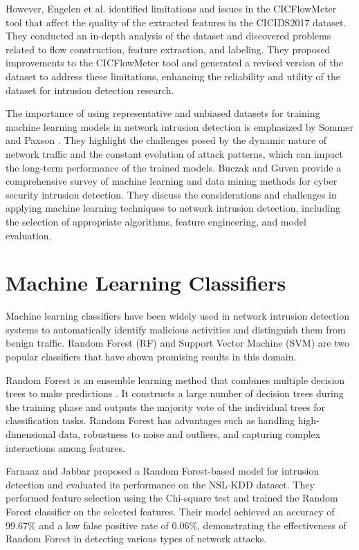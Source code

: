 However, Engelen et al. \cite{engelen2021troubleshooting} identified limitations and issues in the CICFlowMeter tool that affect the quality of the extracted features in the CICIDS2017 dataset. They conducted an in-depth analysis of the dataset and discovered problems related to flow construction, feature extraction, and labeling. They proposed improvements to the CICFlowMeter tool and generated a revised version of the dataset to address these limitations, enhancing the reliability and utility of the dataset for intrusion detection research.

The importance of using representative and unbiased datasets for training machine learning models in network intrusion detection is emphasized by Sommer and Paxson \cite{sommer2010outside}. They highlight the challenges posed by the dynamic nature of network traffic and the constant evolution of attack patterns, which can impact the long-term performance of the trained models. Buczak and Guven \cite{buczak2015survey} provide a comprehensive survey of machine learning and data mining methods for cyber security intrusion detection. They discuss the considerations and challenges in applying machine learning techniques to network intrusion detection, including the selection of appropriate algorithms, feature engineering, and model evaluation.

\section{Machine Learning Classifiers}

Machine learning classifiers have been widely used in network intrusion detection systems to automatically identify malicious activities and distinguish them from benign traffic. Random Forest (RF) and Support Vector Machine (SVM) are two popular classifiers that have shown promising results in this domain.

Random Forest is an ensemble learning method that combines multiple decision trees to make predictions \cite{hastie2009random}. It constructs a large number of decision trees during the training phase and outputs the majority vote of the individual trees for classification tasks. Random Forest has advantages such as handling high-dimensional data, robustness to noise and outliers, and capturing complex interactions among features.

Farnaaz and Jabbar \cite{farnaaz2016random} proposed a Random Forest-based model for intrusion detection and evaluated its performance on the NSL-KDD dataset. They performed feature selection using the Chi-square test and trained the Random Forest classifier on the selected features. Their model achieved an accuracy of 99.67\% and a low false positive rate of 0.06\%, demonstrating the effectiveness of Random Forest in detecting various types of network attacks.

